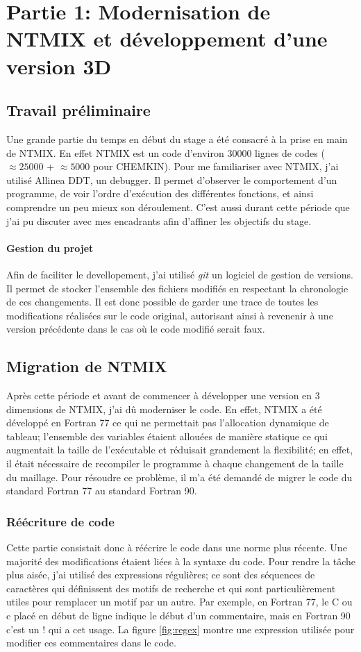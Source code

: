 \section{Partie 1: Modernisation de NTMIX et développement d'une version 3D}

\subsection{Travail préliminaire}
Une grande partie du temps en début du stage a été consacré à la prise en main de NTMIX. En effet NTMIX est un code d'environ 30000 lignes de codes ($\approx 25000$ + $\approx 5000$ pour CHEMKIN). Pour me familiariser avec NTMIX, j'ai utilisé Allinea DDT, un debugger. Il permet d'observer le comportement d'un programme, de voir l'ordre d'exécution des différentes fonctions, et ainsi comprendre un peu mieux son déroulement. C'est aussi durant cette période que j'ai pu discuter avec mes encadrants afin d'affiner les objectifs du stage.

\paragraph{Gestion du projet}Afin de faciliter le devellopement, j'ai utilisé \textit{git} un logiciel de gestion de versions. Il permet de stocker l'ensemble des fichiers modifiés en respectant la chronologie de ces changements. Il est donc possible de garder une trace de toutes les modifications réalisées sur le code original, autorisant ainsi à revenenir à une version précédente dans le cas où le code modifié serait faux.
 
\subsection{Migration de NTMIX}
Après cette période et avant de commencer à développer une version en 3 dimensions de NTMIX, j'ai dû moderniser le code. En effet, NTMIX a été développé en Fortran 77 ce qui ne permettait pas l'allocation dynamique de tableau; l'ensemble des variables étaient allouées de manière statique ce qui augmentait la taille de l'exécutable et réduisait grandement la flexibilité; en effet, il était nécessaire de recompiler le programme à chaque changement de la taille du maillage. Pour résoudre ce problème, il m'a été demandé de migrer le code du standard Fortran 77 au standard Fortran 90.

\subsubsection{Réécriture de code}Cette partie consistait donc à réécrire le code dans une norme plus récente. Une majorité des modifications étaient liées à la syntaxe du code. Pour rendre la tâche plus aisée, j'ai utilisé des expressions régulières; ce sont des séquences de caractères qui définissent des motifs de recherche et qui sont particulièrement utiles pour remplacer un motif par un autre. Par exemple, en Fortran 77, le C ou c placé en début de ligne indique le début d'un commentaire, mais en Fortran 90 c'est un ! qui a cet usage. La figure \ref{fig:regex} montre une expression utilisée pour modifier ces commentaires dans le code.

